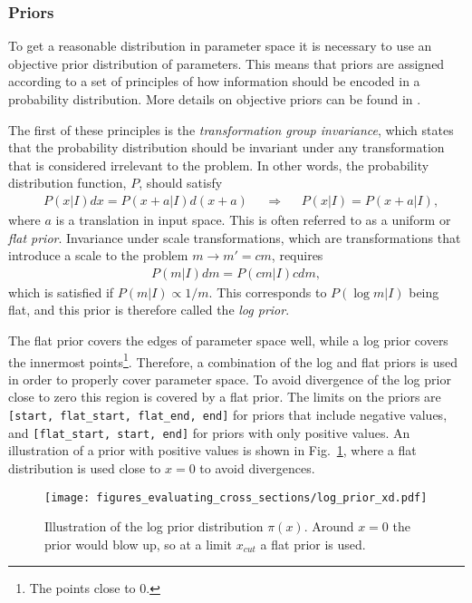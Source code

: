 \documentclass[twoside,english]{uiofysmaster}
\begin{document}
\subsubsection{Priors}

To get a reasonable distribution in parameter space it is necessary to use an objective prior distribution of parameters. This means that priors are assigned according to a set of principles of how information should be encoded in a probability distribution. More details on objective priors can be found in \cite{kvellestad2015chasing}.

The first of these principles is the \textit{transformation group invariance}, which states that the probability distribution should be invariant under any transformation that is considered irrelevant to the problem. In other words, the probability distribution function, $P$, should satisfy
\begin{align}
&P (x|I) dx = P (x+a|I)d(x+a) &&\Rightarrow && P(x|I) = P (x+a|I) ,
\end{align}
where $a$ is a translation in input space. This is often referred to as a uniform or \textit{flat prior}. Invariance under scale transformations, which are transformations that introduce a scale to the problem $m \rightarrow m' = cm$, requires
\begin{align}
P (m | I) dm = P (cm|I) c dm,
\end{align}
which is satisfied if $P (m |I) \propto 1/m$. This corresponds to $P (\log m | I)$ being flat, and this prior is therefore called the \textit{log prior}. 

The flat prior covers the edges of parameter space well, while a log prior covers the innermost points\footnote{The points close to 0.}. Therefore, a combination of the log and flat priors is used in order to properly cover parameter space. To avoid divergence of the log prior close to zero this region is covered by a flat prior. The limits on the priors are \verb|[start, flat_start, flat_end, end]| for priors that include negative values, and \verb|[flat_start, start, end]| for priors with only positive values. An illustration of a prior with positive values is shown in Fig.~\ref{Fig:: evaluating cross : prior illustration}, where a flat distribution is used close to $x=0$ to avoid divergences.

\begin{figure}
\centering
\texttt{[image: figures\_evaluating\_cross\_sections/log\_prior\_xd.pdf]}
\caption{Illustration of the log prior distribution $\pi(x)$. Around $x=0$ the prior would blow up, so at a limit $x_{cut}$ a flat prior is used.}
\label{Fig:: evaluating cross : prior illustration}
\end{figure}
\end{document}
